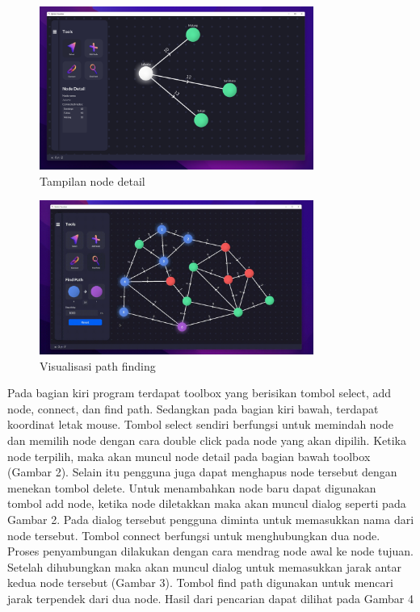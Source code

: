 \documentclass[12pt,a4paper,oneside]{article}
\begin{document}
\begin{figure}[H]
	\centering
	\includegraphics[width=0.8\textwidth]{images/node-detail.png}
	\caption{Tampilan node detail}
\end{figure}
\begin{figure}[H]
	\centering
	\includegraphics[width=0.8\textwidth]{images/find-path.png}
	\caption{Visualisasi path finding}
\end{figure}
Pada bagian kiri program terdapat toolbox yang berisikan tombol select, add node, connect, dan find path. Sedangkan pada bagian kiri bawah, terdapat koordinat letak mouse. Tombol select sendiri berfungsi untuk memindah node dan memilih node dengan cara double click pada node yang akan dipilih. Ketika node terpilih, maka akan muncul node detail pada bagian bawah toolbox (Gambar 2). Selain itu pengguna juga dapat menghapus node tersebut dengan menekan tombol delete. Untuk menambahkan node baru dapat digunakan tombol add node, ketika node diletakkan maka akan muncul dialog seperti pada Gambar 2. Pada dialog tersebut pengguna diminta untuk memasukkan nama dari node tersebut. Tombol connect berfungsi untuk menghubungkan dua node. Proses penyambungan dilakukan dengan cara mendrag node awal ke node tujuan. Setelah dihubungkan maka akan muncul dialog untuk memasukkan jarak antar kedua node tersebut (Gambar 3). Tombol find path digunakan untuk mencari jarak terpendek dari dua node. Hasil dari pencarian dapat dilihat pada Gambar 4 \par
\end{document}
